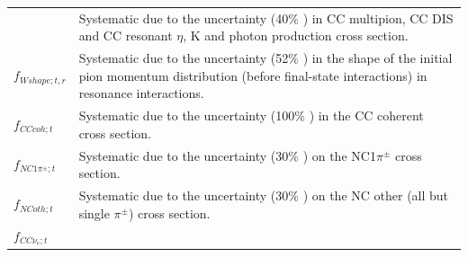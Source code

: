 {\begin{longtable}{p{1.65cm}l}
{  }
&
  \parbox{0.81\textwidth}
  {
    \vspace{0.1cm}
    Systematic due to the uncertainty (40\% \cite{MoreNIWGErr113}) in CC multipion, CC DIS and CC resonant $\eta$, K and photon production cross section.
    \vspace{0.1cm}
  }
\\
  \parbox{0.15\textwidth}
  {
    \vspace{0.1cm}
    $f_{Wshape; t, r}$
    \vspace{0.1cm}
  }
&
  \parbox{0.81\textwidth}
  {
    \vspace{0.1cm}
    Systematic due to the uncertainty (52\% \cite{MoreNIWGErr113}) in the shape of the 
    initial pion momentum distribution (before final-state interactions) in resonance interactions. 
    \vspace{0.1cm}
  }
\\
  \parbox{0.15\textwidth}
  {
    \vspace{0.1cm}
    $f_{CCcoh; t}$
    \vspace{0.1cm}
  }
&
  \parbox{0.81\textwidth}
  {
    \vspace{0.1cm}
    Systematic due to the uncertainty (100\% \cite{MoreNIWGErr113}) in the CC coherent cross section.
    \vspace{0.1cm}
  }
\\
  \parbox{0.15\textwidth}
  {
    \vspace{0.1cm}
    $f_{NC1\pi^\pm; t}$
    \vspace{0.1cm}
  }
&
  \parbox{0.81\textwidth}
  {
    \vspace{0.1cm}
    Systematic due to the uncertainty (30\% \cite{MoreNIWGErr113}) on the NC1$\pi^\pm$ cross section.
    \vspace{0.1cm}
  }
\\
  \parbox{0.15\textwidth}
  {
    \vspace{0.1cm}
    $f_{NCoth; t}$
    \vspace{0.1cm}
  }
&
  \parbox{0.81\textwidth}
  {
    \vspace{0.1cm}
    Systematic due to the uncertainty (30\% \cite{MoreNIWGErr113}) on the NC other (all but single $\pi^\pm$) cross section.
    \vspace{0.1cm}
  }
\\
  \parbox{0.15\textwidth}
  {
    \vspace{0.1cm}
    $f_{CC\nu_e; t}$
    \vspace{0.1cm}
  }
&
  \parbox{0.81\textwidth}
  {
    \vspace{0.1cm}
}
\end{longtable}}
